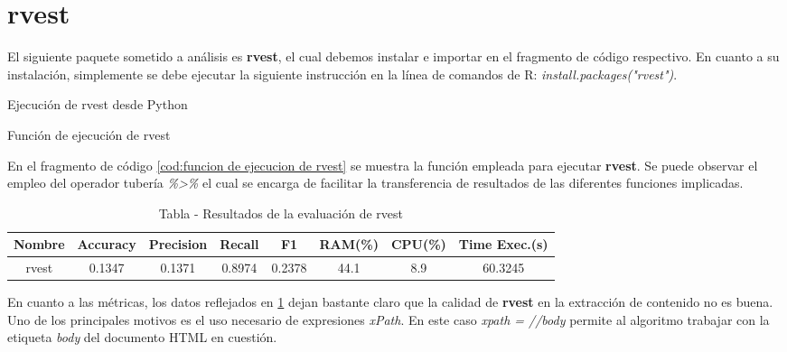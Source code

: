 \section*{rvest}

El siguiente paquete sometido a análisis es \textbf{rvest}, el cual debemos instalar e importar en el
fragmento de código respectivo. En cuanto a su instalación, simplemente se debe ejecutar la siguiente
instrucción en la línea de comandos de R: \emph{install.packages("rvest")}.

\begin{codefloat}
    
    \caption{Ejecución de rvest desde Python}
    \label{cod:ejecucion de rvest desde python}
\end{codefloat}

\begin{codefloat}
    
    \caption{Función de ejecución de rvest}
    \label{cod:funcion de ejecucion de rvest}
\end{codefloat}

En el fragmento de código \ref{cod:funcion de ejecucion de rvest} se muestra la función empleada para
ejecutar \textbf{rvest}. Se puede observar el empleo del operador tubería \emph{\%>\%} el cual se encarga
de facilitar la transferencia de resultados de las diferentes funciones implicadas.

\begin{table}[h]
    \begin{center}
      \begin{tabular}{| c | c | c | c | c | c | c | c |} \hline 
       \textbf{Nombre} & \textbf{Accuracy} & \textbf{Precision}  & \textbf{Recall} & \textbf{F1} & \textbf{RAM(\%)} & \textbf{CPU(\%)} & \textbf{Time Exec.(s)} \\ \hline
       rvest & 0.1347 & 0.1371 & 0.8974 & 0.2378 & 44.1 & 8.9 & 60.3245 \\ \hline
      \end{tabular}
      \caption{Tabla - Resultados de la evaluación de rvest}
      \label{tab:tabla - resultados de la evaluacion de rvest}
    \end{center}
\end{table}

En cuanto a las métricas, los datos reflejados en \ref{tab:tabla - resultados de la evaluacion de rvest}
dejan bastante claro que la calidad de \textbf{rvest} en la extracción de contenido no es buena. Uno de
los principales motivos es el uso necesario de expresiones \emph{xPath}. En este caso \emph{xpath = //body} 
permite al algoritmo trabajar con la etiqueta \emph{body} del documento HTML en cuestión.

